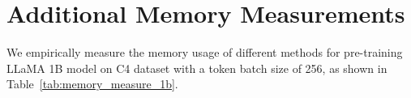 \newpage
\section{Additional Memory Measurements}


We empirically measure the memory usage of different methods for pre-training LLaMA 1B model on C4 dataset with a token batch size of 256, as shown in Table~\ref{tab:memory_measure_1b}.








